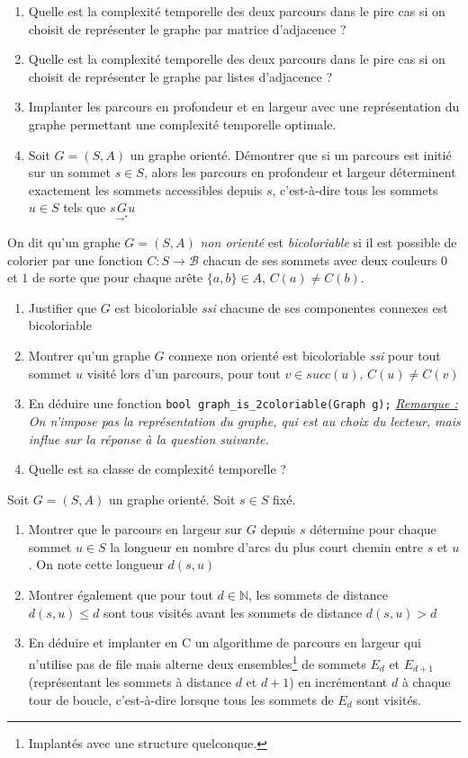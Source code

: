 \documentclass[../../../main.tex]{subfiles}
\begin{document}
\begin{enumerate}
	\item Quelle est la complexité temporelle des deux parcours dans le pire cas si on choisit de représenter le graphe par matrice d'adjacence ?
	\item Quelle est la complexité temporelle des deux parcours dans le pire cas si on choisit de représenter le graphe par listes d'adjacence ?
	\item Implanter les parcours en profondeur et en largeur avec une représentation du graphe permettant une complexité temporelle optimale.
	\item Soit $G = (S, A)$ un graphe orienté. Démontrer que si un parcours est initié sur un sommet $s\in S$, alors les parcours en profondeur et largeur déterminent exactement les sommets accessibles depuis $s$, c'est-à-dire tous les sommets $u\in S$ tels que $s\underset{\rightarrow^\star}{G} u$
\end{enumerate}

 On dit qu'un graphe $G = (S, A)$ \textit{non orienté} est \textit{bicoloriable} si il est possible de colorier par une fonction $C:S\rightarrow \mathcal{B}$ chacun de ses sommets avec deux couleurs $0$ et $1$ de sorte que pour chaque arête $\{a, b\}\in A$, $C(a)\neq C(b)$.
\begin{enumerate}
	\item Justifier que $G$ est bicoloriable \textit{ssi} chacune de ses componentes connexes est bicoloriable
	\item Montrer qu'un graphe $G$ connexe non orienté est bicoloriable \textit{ssi} pour tout sommet $u$ visité lors d'un parcours, pour tout $v\in succ(u)$, $C(u)\neq C(v)$ 
	\item En déduire une fonction \texttt{bool graph_is_2coloriable(Graph g);} \newline
	\textit{\underline{Remarque :} On n'impose pas la représentation du graphe, qui est au choix du lecteur, mais influe sur la réponse à la question suivante.}
	\item Quelle est sa classe de complexité temporelle ?
\end{enumerate}

 Soit $G = (S, A)$ un graphe orienté. Soit $s\in S$ fixé.
\begin{enumerate}
	\item Montrer que le parcours en largeur sur $G$ depuis $s$ détermine pour chaque sommet $u\in S$ la longueur en nombre d'arcs du plus court chemin entre $s$ et $u$. On note cette longueur $d(s, u)$
	\item Montrer également que pour tout $d\in\mathbb{N}$, les sommets de distance $d(s, u)\leq d$ sont tous visités avant les sommets de distance $d(s, u) > d$
	\item En déduire et implanter en C un algorithme de parcours en largeur qui n'utilise pas de file mais alterne deux ensembles\footnote{Implantés avec une structure quelconque.} de sommets $E_d$ et $E_{d+1}$ (représentant les sommets à distance $d$ et $d+1$) en incrémentant $d$ à chaque tour de boucle, c'est-à-dire lorsque tous les sommets de $E_d$ sont visités.
\end{enumerate}
\end{document}
